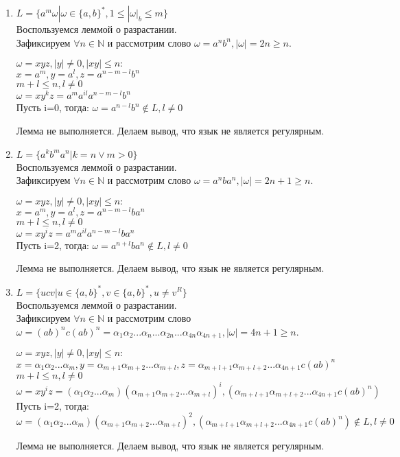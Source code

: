 \documentclass[12pt, a4paper]{article}
\begin{document}
\begin{enumerate}
    \item \(L=\{a^m\omega | \omega \in \{a,b\}^*, 1 \leq |\omega|_b \leq m\}\)
\\Воспользуемся леммой о разрастании.
\\Зафиксируем \(\forall n \in \mathbb{N}\) и рассмотрим слово \(\omega = a^nb^n, |\omega|=2n \geq n\).
\begin{center}
\(\omega = xyz, |y| \neq 0, |xy| \leq n:\)
\\\(x=a^m, y=a^l, z=a^{n-m-l}b^n\)
\\\(m+l \leq n, l \neq 0\)
\\\(\omega = xy^kz=a^ma^{il}a^{n-m-l}b^n\)
\\Пусть i=0, тогда: \(\omega = a^{n-l}b^n \notin L, l \neq 0\)
\end{center}
Лемма не выполняется. Делаем вывод, что язык не является регулярным.

    \item \(L=\{a^kb^ma^n | k = n \vee m > 0\}\)
\\Воспользуемся леммой о разрастании.
\\Зафиксируем \(\forall n \in \mathbb{N}\) и рассмотрим слово \(\omega = a^nba^n, |\omega|=2n+1 \geq n\).
\begin{center}
\(\omega = xyz, |y| \neq 0, |xy| \leq n:\)
\\\(x=a^m, y=a^l, z=a^{n-m-l}ba^n\)
\\\(m+l \leq n, l \neq 0\)
\\\(\omega = xy^iz=a^ma^{il}a^{n-m-l}ba^n\)
\\Пусть i=2, тогда: \(\omega = a^{n+l}ba^n \notin L, l \neq 0\)
\end{center}
Лемма не выполняется. Делаем вывод, что язык не является регулярным.

    \item \(L=\{ucv | u \in \{a,b\}^*, v \in \{a,b\}^*, u \neq v^R\}\)
\\Воспользуемся леммой о разрастании.
\\Зафиксируем \(\forall n \in \mathbb{N}\) и рассмотрим слово \(\omega = (ab)^nc(ab)^n=\alpha_1\alpha_2...\alpha_n...\alpha_{2n}...\alpha_{4n}\alpha_{4n+1}, |\omega|=4n+1 \geq n\).
\begin{center}
\(\omega = xyz, |y| \neq 0, |xy| \leq n:\)
\\\(x=\alpha_1\alpha_2...\alpha_m, y=\alpha_{m+1}\alpha_{m+2}...\alpha_{m+l}, z=\alpha_{m+l+1}\alpha_{m+l+2}...\alpha_{4n+1}c(ab)^n\)
\\\(m+l \leq n, l \neq 0\)
\\\(\omega = xy^iz=(\alpha_1\alpha_2...\alpha_m)(\alpha_{m+1}\alpha_{m+2}...\alpha_{m+l})^i,(\alpha_{m+l+1}\alpha_{m+l+2}...\alpha_{4n+1}c(ab)^n)\)
\\Пусть i=2, тогда: \(\omega = (\alpha_1\alpha_2...\alpha_m)(\alpha_{m+1}\alpha_{m+2}...\alpha_{m+l})^2,(\alpha_{m+l+1}\alpha_{m+l+2}...\alpha_{4n+1}c(ab)^n) \notin L, l \neq 0\)
\end{center}
Лемма не выполняется. Делаем вывод, что язык не является регулярным.
\end{enumerate}
\end{document}
